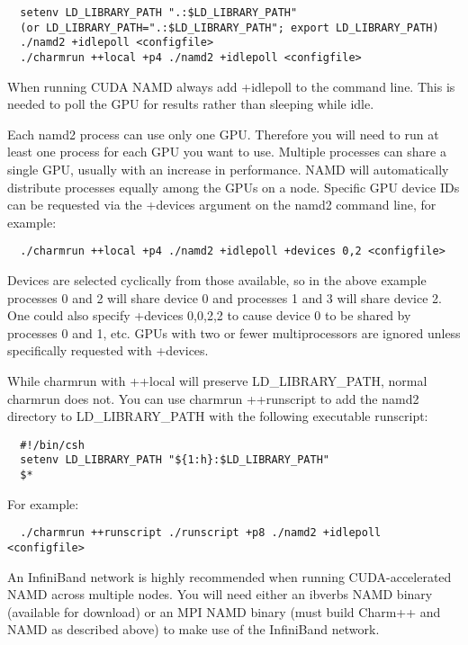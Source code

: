 \begin{verbatim}
  setenv LD_LIBRARY_PATH ".:$LD_LIBRARY_PATH"
  (or LD_LIBRARY_PATH=".:$LD_LIBRARY_PATH"; export LD_LIBRARY_PATH)
  ./namd2 +idlepoll <configfile>
  ./charmrun ++local +p4 ./namd2 +idlepoll <configfile>
\end{verbatim}

When running CUDA NAMD always add +idlepoll to the command line.  This
is needed to poll the GPU for results rather than sleeping while idle.

Each namd2 process can use only one GPU.  Therefore you will need to run
at least one process for each GPU you want to use.  Multiple processes
can share a single GPU, usually with an increase in performance.  NAMD
will automatically distribute processes equally among the GPUs on a node.
Specific GPU device IDs can be requested via the +devices argument on
the namd2 command line, for example:

\begin{verbatim}
  ./charmrun ++local +p4 ./namd2 +idlepoll +devices 0,2 <configfile>
\end{verbatim}

Devices are selected cyclically from those available, so in the above
example processes 0 and 2 will share device 0 and processes 1 and 3 will
share device 2.  One could also specify +devices 0,0,2,2 to cause device
0 to be shared by processes 0 and 1, etc.  GPUs with two or fewer
multiprocessors are ignored unless specifically requested with +devices.

While charmrun with ++local will preserve LD\_LIBRARY\_PATH, normal
charmrun does not.  You can use charmrun ++runscript to add the namd2
directory to LD\_LIBRARY\_PATH with the following executable runscript:

\begin{verbatim}
  #!/bin/csh
  setenv LD_LIBRARY_PATH "${1:h}:$LD_LIBRARY_PATH"
  $*
\end{verbatim}

For example:

\begin{verbatim}
  ./charmrun ++runscript ./runscript +p8 ./namd2 +idlepoll <configfile>
\end{verbatim}

An InfiniBand network is highly recommended when running CUDA-accelerated
NAMD across multiple nodes.  You will need either an ibverbs NAMD binary
(available for download) or an MPI NAMD binary (must build Charm++ and
NAMD as described above) to make use of the InfiniBand network.

